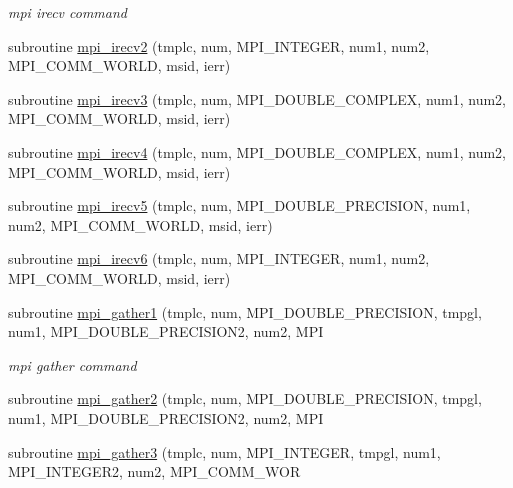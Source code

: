 \begin{DoxyCompactItemize}
\begin{DoxyCompactList}\small\item\em mpi irecv command \end{DoxyCompactList}\item 
subroutine \mbox{\hyperlink{namespacempistub_a3f6d6a1e356cf0bed0327c5b9df47498}{mpi\+\_\+irecv2}} (tmplc, num, M\+P\+I\+\_\+\+I\+N\+T\+E\+G\+ER, num1, num2, M\+P\+I\+\_\+\+C\+O\+M\+M\+\_\+\+W\+O\+R\+LD, msid, ierr)
\item 
subroutine \mbox{\hyperlink{namespacempistub_ad39ca4d74dbf2a6bc63895fa2503e945}{mpi\+\_\+irecv3}} (tmplc, num, M\+P\+I\+\_\+\+D\+O\+U\+B\+L\+E\+\_\+\+C\+O\+M\+P\+L\+EX, num1, num2, M\+P\+I\+\_\+\+C\+O\+M\+M\+\_\+\+W\+O\+R\+LD, msid, ierr)
\item 
subroutine \mbox{\hyperlink{namespacempistub_a99d8cacbf221fe5a3829f6dbc22159a6}{mpi\+\_\+irecv4}} (tmplc, num, M\+P\+I\+\_\+\+D\+O\+U\+B\+L\+E\+\_\+\+C\+O\+M\+P\+L\+EX, num1, num2, M\+P\+I\+\_\+\+C\+O\+M\+M\+\_\+\+W\+O\+R\+LD, msid, ierr)
\item 
subroutine \mbox{\hyperlink{namespacempistub_a42635e07cedd999352dec8ee45a378f5}{mpi\+\_\+irecv5}} (tmplc, num, M\+P\+I\+\_\+\+D\+O\+U\+B\+L\+E\+\_\+\+P\+R\+E\+C\+I\+S\+I\+ON, num1, num2, M\+P\+I\+\_\+\+C\+O\+M\+M\+\_\+\+W\+O\+R\+LD, msid, ierr)
\item 
subroutine \mbox{\hyperlink{namespacempistub_a38d4bf89b91c8dac22d310c6e73ced41}{mpi\+\_\+irecv6}} (tmplc, num, M\+P\+I\+\_\+\+I\+N\+T\+E\+G\+ER, num1, num2, M\+P\+I\+\_\+\+C\+O\+M\+M\+\_\+\+W\+O\+R\+LD, msid, ierr)
\item 
subroutine \mbox{\hyperlink{namespacempistub_a3e61dfb24d3caebd2c2983a9e4ab3dfd}{mpi\+\_\+gather1}} (tmplc, num, M\+P\+I\+\_\+\+D\+O\+U\+B\+L\+E\+\_\+\+P\+R\+E\+C\+I\+S\+I\+ON, tmpgl, num1, M\+P\+I\+\_\+\+D\+O\+U\+B\+L\+E\+\_\+\+P\+R\+E\+C\+I\+S\+I\+O\+N2, num2, M\+PI
\begin{DoxyCompactList}\small\item\em mpi gather command \end{DoxyCompactList}\item 
subroutine \mbox{\hyperlink{namespacempistub_a9be56b07b004daadf8c9baeb3f79a9eb}{mpi\+\_\+gather2}} (tmplc, num, M\+P\+I\+\_\+\+D\+O\+U\+B\+L\+E\+\_\+\+P\+R\+E\+C\+I\+S\+I\+ON, tmpgl, num1, M\+P\+I\+\_\+\+D\+O\+U\+B\+L\+E\+\_\+\+P\+R\+E\+C\+I\+S\+I\+O\+N2, num2, M\+PI
\item 
subroutine \mbox{\hyperlink{namespacempistub_a4a5262ac6eca022843c0cd39b508e35f}{mpi\+\_\+gather3}} (tmplc, num, M\+P\+I\+\_\+\+I\+N\+T\+E\+G\+ER, tmpgl, num1, M\+P\+I\+\_\+\+I\+N\+T\+E\+G\+E\+R2, num2, M\+P\+I\+\_\+\+C\+O\+M\+M\+\_\+\+W\+OR

\end{DoxyCompactItemize}
